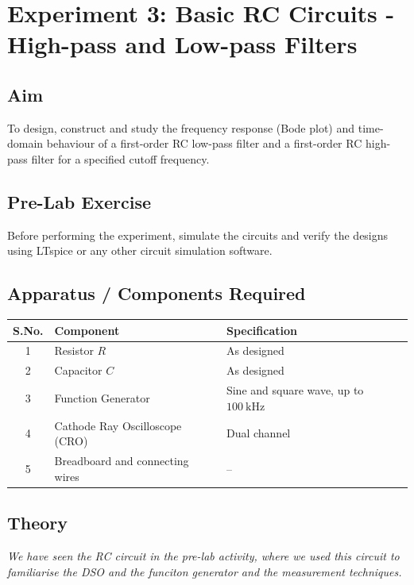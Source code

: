 
\chapter{Experiment 3: Basic RC Circuits - High-pass and Low-pass Filters}

\section{Aim}
To design, construct and study the frequency response (Bode plot) and
time-domain behaviour of a first-order RC low-pass filter and a first-order
RC high-pass filter for a specified cutoff frequency.
\section{Pre-Lab Exercise}
Before performing the experiment, simulate the circuits and verify the designs using LTspice or any other circuit simulation software. 
\section{Apparatus / Components Required}
\begin{center}
	\begin{tabular}{@{}cll@{}}
		\toprule
		S.No. & Component & Specification \\
		\midrule
		1 & Resistor $R$ & As designed \\
		2 & Capacitor $C$ & As designed \\
		3 & Function Generator & Sine and square wave, up to $100\ \text{kHz}$ \\
		4 & Cathode Ray Oscilloscope (CRO) & Dual channel \\
		5 & Breadboard and connecting wires & -- \\
		\bottomrule
	\end{tabular}
\end{center}

\section{Theory}
\emph{We have seen the RC circuit in the pre-lab activity, where we used this circuit to familiarise the DSO and the funciton generator and the measurement techniques.}

